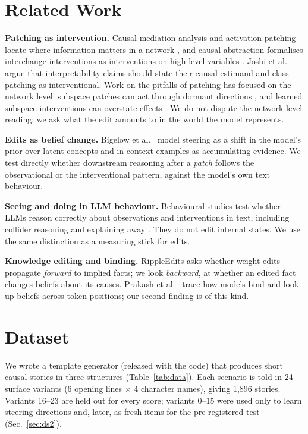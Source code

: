 \documentclass[conference]{IEEEtran}
\begin{document}
\section{Related Work}
\textbf{Patching as intervention.} Causal mediation analysis and activation patching locate where information matters in a network \cite{vig2020,meng2022,heimersheim2024}, and causal abstraction formalises interchange interventions as interventions on high-level variables \cite{geiger2025}. Joshi et al.\ \cite{joshi2026} argue that interpretability claims should state their causal estimand and class patching as interventional. Work on the pitfalls of patching has focused on the network level: subspace patches can act through dormant directions \cite{makelov2024}, and learned subspace interventions can overstate effects \cite{tanyel2026}. We do not dispute the network-level reading; we ask what the edit amounts to in the world the model represents.

\textbf{Edits as belief change.} Bigelow et al.\ \cite{bigelow2025} model steering as a shift in the model's prior over latent concepts and in-context examples as accumulating evidence. We test directly whether downstream reasoning after a \emph{patch} follows the observational or the interventional pattern, against the model's own text behaviour.

\textbf{Seeing and doing in LLM behaviour.} Behavioural studies test whether LLMs reason correctly about observations and interventions in text, including collider reasoning and explaining away \cite{dettki2025,dettki2026,feng2026}. They do not edit internal states. We use the same distinction as a measuring stick for edits.

\textbf{Knowledge editing and binding.} RippleEdits \cite{cohen2024} asks whether weight edits propagate \emph{forward} to implied facts; we look \emph{backward}, at whether an edited fact changes beliefs about its causes. Prakash et al.\ \cite{prakash2026} trace how models bind and look up beliefs across token positions; our second finding is of this kind.

\section{Dataset}
We wrote a template generator (released with the code) that produces short causal stories in three structures (Table~\ref{tab:data}). Each scenario is told in 24 surface variants (6 opening lines $\times$ 4 character names), giving 1{,}896 stories. Variants 16--23 are held out for every score; variants 0--15 were used only to learn steering directions and, later, as fresh items for the pre-registered test (Sec.~\ref{sec:ds2}).
\end{document}
